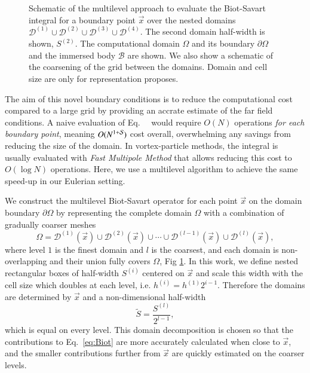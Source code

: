 \documentclass[preprint,12pt]{elsarticle}
\begin{document}
\begin{figure}
    \centering
    \def\svgwidth{0.9\columnwidth}
    
    \caption{Schematic of the multilevel approach to evaluate the Biot-Savart integral for a boundary point $\vec x$ over the nested domains $\mathcal{D}^{(1)} \cup \mathcal{D}^{(2)} \cup \mathcal{D}^{(3)} \cup \mathcal{D}^{(4)}$. The second domain half-width is shown, ${S}^{(2)}$. The computational domain $\Omega$ and its boundary $\partial\Omega$ and the immersed body $\mathcal{B}$ are shown. We also show a schematic of the coarsening of the grid between the domains. Domain and cell size are only for representation proposes.}
    \label{Fig_2}
\end{figure}

The aim of this novel boundary conditions is to reduce the computational cost compared to a large grid by providing an accrate estimate of the far field conditions. A naive evaluation of Eq.~\theequation~ would require $O(N)$ operations \textit{for each boundary point}, meaning $O(N^{1+\cal S})$ cost overall, overwhelming any savings from reducing the size of the domain. In vortex-particle methods, the integral is usually evaluated with \emph{Fast Multipole Method} that allows reducing this cost to $O(\log N)$ operations. Here, we use a multilevel algorithm to achieve the same speed-up in our Eulerian setting.


We construct the multilevel Biot-Savart operator for each point $\vec x$ on the domain boundary $\partial \Omega$ by representing the complete domain $\Omega$ with a combination of gradually coarser meshes
\begin{equation}\label{eq:multilevel}
    \Omega = \mathcal{D}^{(1)}(\vec x) \cup \mathcal{D}^{(2)}(\vec x) \cup \cdots \cup \mathcal{D}^{(l-1)}(\vec x) \cup \mathcal{D}^{(l)}(\vec x),
\end{equation}
where level $1$ is the finest domain and $l$ is the coarsest, and each domain is non-overlapping and their union fully covers $\Omega$, Fig \ref{Fig_2}. In this work, we define nested rectangular boxes of half-width $S^{(i)}$ centered on $\vec x$ and scale this width with the cell size which doubles at each level, i.e. $
h^{(i)} = h^{(1)} 2^{i-1}$. Therefore the domains are determined by $\vec x$ and a non-dimensional half-width 
\begin{equation}\label{eq:bbox}
    \tilde{S} = \frac{{S}^{(l)}}{2^{l-1}},
\end{equation}
which is equal on every level. This domain decomposition is chosen so that the contributions to Eq.~\eqref{eq:Biot} are more accurately calculated when close to $\vec x$, and the smaller contributions further from $\vec x$ are quickly estimated on the coarser levels.
\end{document}
